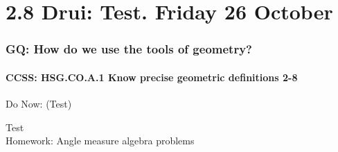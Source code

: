 \documentclass{beamer}
\begin{document}
\section{2.8 Drui: Test. Friday 26 October}
        \frame
        {
          \frametitle{GQ: How do we use the tools of geometry?}
          \framesubtitle{CCSS: HSG.CO.A.1 Know precise geometric definitions  \alert{2-8}}

          \begin{block}{Do Now: (Test)}
          \end{block}
          Test\\
          \vspace{1cm}
          Homework: Angle measure algebra problems
        }
\end{document}
